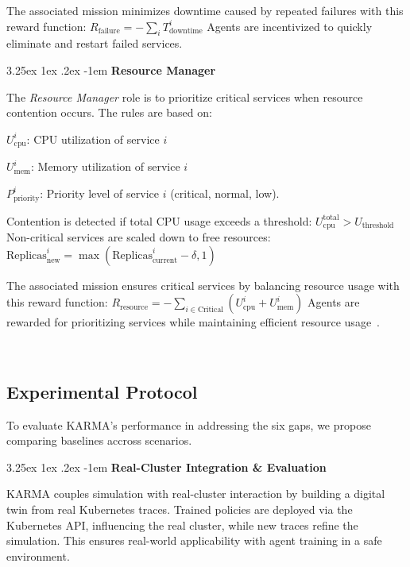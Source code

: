 \documentclass[conference]{IEEEtran}
\makeatletter
\renewcommand\paragraph{\@startsection{paragraph}{5}{\z@}%
  {3.25ex \@plus1ex \@minus.2ex}%
  {-1em}%
  {\normalfont\normalsize\bfseries}}
\makeatother
\begin{document}
The associated mission minimizes downtime caused by repeated failures with this reward function:
$R_{\text{failure}} = - \sum_{i} T_{\text{downtime}}^i$
Agents are incentivized to quickly eliminate and restart failed services.

\noindent \paragraph{\textbf{Resource Manager}}

The \textit{Resource Manager} role is to prioritize critical services when resource contention occurs. The rules are based on:
\begin{enumerate*}[label={}, itemjoin={;\quad }]
    \item \( U_{\text{cpu}}^i \): CPU utilization of service \( i \)
    \item \( U_{\text{mem}}^i \): Memory utilization of service \( i \)
    \item \( P_{\text{priority}}^i \): Priority level of service \( i \) (critical, normal, low).
\end{enumerate*}
Contention is detected if total CPU usage exceeds a threshold:
$U_{\text{cpu}}^{\text{total}} > U_{\text{threshold}}$
Non-critical services are scaled down to free resources:
$\text{Replicas}_{\text{new}}^i = \max\left( \text{Replicas}_{\text{current}}^i - \delta, 1 \right)$

The associated mission ensures critical services by balancing resource usage with this reward function:
$R_{\text{resource}} = - \sum_{i \in \text{Critical}} \left( U_{\text{cpu}}^i + U_{\text{mem}}^i \right)$
Agents are rewarded for prioritizing services while maintaining efficient resource usage~\cite{shahrad2020resource}.

\

\subsection{Experimental Protocol}

\noindent To evaluate KARMA's performance in addressing the six gaps, we propose comparing baselines accross scenarios.

\paragraph{\textbf{Real-Cluster Integration \& Evaluation}}

KARMA couples simulation with real-cluster interaction by building a digital twin from real Kubernetes traces. Trained policies are deployed via the Kubernetes API, influencing the real cluster, while new traces refine the simulation. This ensures real-world applicability with agent training in a safe environment.
\end{document}
